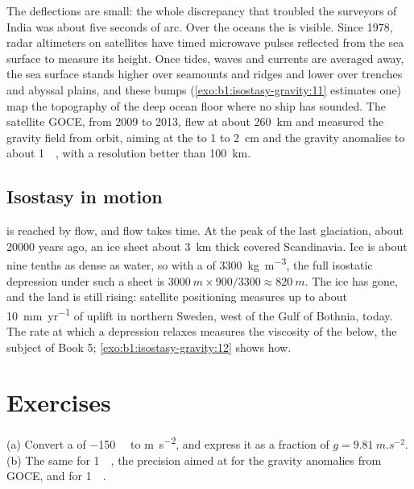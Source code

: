 The deflections are small: the whole discrepancy that troubled the surveyors
of India was about five seconds of arc. Over the oceans the  is visible.
Since 1978, radar altimeters on satellites have timed microwave pulses
reflected from the sea surface to measure its height. Once tides, waves and
currents are averaged away, the sea surface stands higher over seamounts and
ridges and lower over trenches and abyssal plains, and these bumps (\cref{exo:b1:isostasy-gravity:11}
estimates one) map the topography of the deep ocean floor where no ship has
sounded. The satellite GOCE, from 2009 to 2013, flew at about \qty{260}{km}
and measured the gravity field from orbit, aiming at the  to 1 to
\qty{2}{cm} and the gravity anomalies to about \qty{1}{\milli\gal}, with a
resolution better than \qty{100}{km}.

\subsection*{Isostasy in motion}

 is reached by flow, and flow takes time. At the peak of the last
glaciation, about \num{20000} years ago, an ice sheet about \qty{3}{km} thick
covered Scandinavia.
Ice is about nine tenths as dense as water, so with a  of
\qty{3300}{kg.m^{-3}}, the full isostatic depression under such a sheet is
$\qty{3000}{m}\times900/3300 \approx \qty{820}{m}$. The ice has gone, and the
land is still rising: satellite positioning measures up to about
\qty{10}{mm.yr^{-1}} of uplift in northern Sweden, west of the Gulf of Bothnia,
today. The
rate at which a depression relaxes measures the viscosity of the  below,
the subject of Book 5; \cref{exo:b1:isostasy-gravity:12} shows how.

\section{Exercises}

\begin{exercise}[$\star$]\label{exo:b1:isostasy-gravity:1}
(a) Convert a  of \qty{-150}{\milli\gal} to \unit{m.s^{-2}},
and express it as a fraction of $g = \qty{9.81}{m.s^{-2}}$. (b) The same for
\qty{1}{\milli\gal}, the precision aimed at for the gravity anomalies from
GOCE, and for \qty{1}{\micro\gal}.
\end{exercise}

